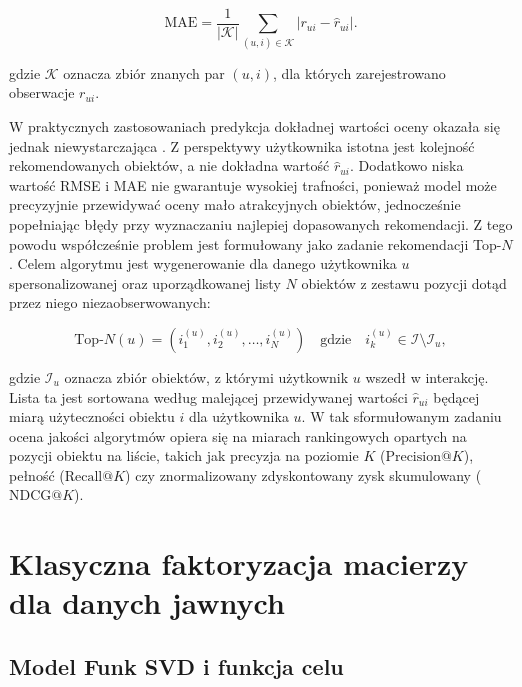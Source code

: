 \begin{equation}
    \text{MAE} = \frac{1}{|\mathcal{K}|} \sum_{(u,i) \in \mathcal{K}} \left|r_{ui} - \hat{r}_{ui}\right|.
\end{equation}

gdzie $\mathcal{K}$ oznacza zbiór znanych par $(u,i)$, dla których zarejestrowano obserwacje $r_{ui}$.

W praktycznych zastosowaniach predykcja dokładnej wartości oceny okazała się jednak niewystarczająca \cite{cremonesi2010performance}. Z perspektywy użytkownika istotna jest kolejność rekomendowanych obiektów, a nie dokładna wartość $\hat{r}_{ui}$. Dodatkowo niska wartość RMSE i MAE nie gwarantuje wysokiej trafności, ponieważ model może precyzyjnie przewidywać oceny mało atrakcyjnych obiektów, jednocześnie popełniając błędy przy wyznaczaniu najlepiej dopasowanych rekomendacji. Z tego powodu współcześnie problem jest formułowany jako zadanie rekomendacji Top-$N$. Celem algorytmu jest wygenerowanie dla danego użytkownika $u$ spersonalizowanej oraz uporządkowanej listy $N$ obiektów z zestawu pozycji dotąd przez niego niezaobserwowanych:

\begin{equation}
    \text{Top-}N(u) = \left( i_1^{(u)}, i_2^{(u)}, \dots, i_N^{(u)} \right) \quad \text{gdzie} \quad i_k^{(u)} \in \mathcal{I} \setminus \mathcal{I}_u,
\end{equation}

gdzie $\mathcal{I}_u$ oznacza zbiór obiektów, z którymi użytkownik $u$ wszedł w interakcję. Lista ta jest sortowana według malejącej przewidywanej wartości $\hat{r}_{ui}$ będącej miarą użyteczności obiektu $i$ dla użytkownika $u$. W tak sformułowanym zadaniu ocena jakości algorytmów opiera się na miarach rankingowych opartych na pozycji obiektu na liście, takich jak precyzja na poziomie $K$ ($\text{Precision}@K$), pełność ($\text{Recall}@K$) czy znormalizowany zdyskontowany zysk skumulowany ($\text{NDCG}@K$).

\section{Klasyczna faktoryzacja macierzy dla danych jawnych}

\subsection{Model Funk SVD i funkcja celu}

